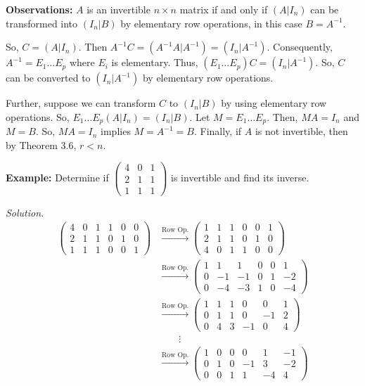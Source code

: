 \documentclass[12pt]{article}
\begin{document}
\noindent\textbf{Observations:} $A$ is an invertible $n \times n$ matrix if and only if $(A | I_n)$ can be transformed into $(I_n | B)$ by elementary row operations, in this case $B = A^{-1}$.

So, $C = (A | I_n)$. Then $A^{-1}C = (A^{-1}A | A^{-1}) = (I_n | A^{-1})$. Consequently, $A^{-1} = E_1 \dots E_p$ where $E_i$ is elementary. Thus, $(E_1 \dots E_p)C = (I_n | A^{-1})$. So, $C$ can be converted to $(I_n| A^{-1})$ by elementary row operations.

Further, suppose we can transform $C$ to $(I_n | B)$ by using elementary row operations. So, $E_1 \dots E_p(A | I_n) = (I_n | B)$. Let $M = E_1 \dots E_p$. Then, $MA = I_n$ and $M = B$. So, $MA = I_n$ implies $M = A^{-1} = B$. Finally, if $A$ is not invertible, then by Theorem 3.6, $r < n$.

\noindent\textbf{Example:} Determine if $\begin{pmatrix}
4 & 0 & 1 \\ 2 & 1 & 1 \\ 1 & 1 & 1
\end{pmatrix}$ is invertible and find its inverse.

\textit{Solution.}\begin{align*}
    \left(\begin{array}{ccc|ccc}
    4 & 0 & 1 & 1 & 0 & 0 \\
    2 & 1 & 1 & 0 & 1 & 0 \\
    1 & 1 & 1 & 0 & 0 & 1
    \end{array}\right) &\xrightarrow{\text{Row Op.}}     \left(\begin{array}{ccc|ccc}
    1 & 1 & 1 & 0 & 0 & 1 \\
    2 & 1 & 1 & 0 & 1 & 0 \\
    4 & 0 & 1 & 1 & 0 & 0
    \end{array}\right)\\
    &\xrightarrow{\text{Row Op.}} \left(\begin{array}{ccc|ccc}
    1 & 1 & 1 & 0 & 0 & 1 \\
    0 & -1 & -1 & 0 & 1 & -2 \\
    0 & -4 & -3 & 1 & 0 & -4
    \end{array}\right)\\
    &\xrightarrow{\text{Row Op.}} \left(\begin{array}{ccc|ccc}
    1 & 1 & 1 & 0 & 0 & 1 \\
    0 & 1 & 1 & 0 & -1 & 2 \\
    0 & 4 & 3 & -1 & 0 & 4
    \end{array}\right)\\
    &\hspace{2em}\vdots \\
    &\xrightarrow{\text{Row Op.}} \left(\begin{array}{ccc|ccc}
    1 & 0 & 0 & 0 & 1 & -1 \\
    0 & 1 & 0 & -1 & 3 & -2 \\
    0 & 0 & 1 & 1 & -4 & 4
    \end{array}\right)
\end{align*}
\end{document}
